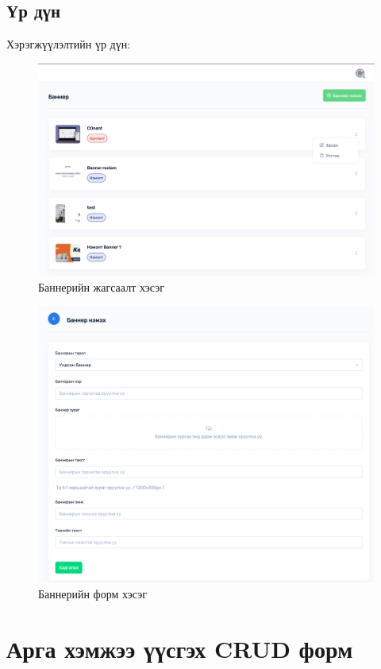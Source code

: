 \subsection{Үр дүн}
Хэрэгжүүлэлтийн үр дүн:
\begin{figure}
	\centering
	\includegraphics[scale=0.15]{src/images/banner-list.png}
	\caption{Баннерийн жагсаалт хэсэг}
\end{figure}
\begin{figure}
	\centering
	\includegraphics[scale=0.15]{src/images/banner-form.png}
	\caption{Баннерийн форм хэсэг}
\end{figure}


\section{Арга хэмжээ үүсгэх CRUD форм}
